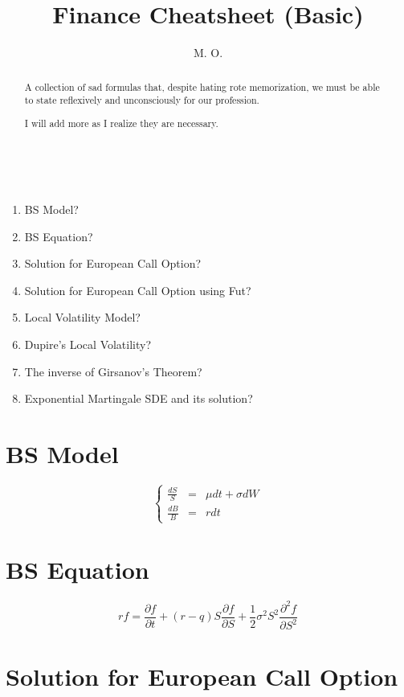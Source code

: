 \documentclass[uplatex]{jsarticle}
\title{
Finance Cheatsheet (Basic)
}
\author{
M. O.
}
\begin{document}
\maketitle

\begin{abstract}
	A collection of sad formulas that, despite hating rote memorization, we must be able to state reflexively and unconsciously for our profession.

	I will add more as I realize they are necessary.
\end{abstract}

\ \\

\begin{enumerate}
	\item BS Model?
	\item BS Equation?
	\item Solution for European Call Option?
	\item Solution for European Call Option using Fut?
	\item Local Volatility Model?
	\item Dupire's Local Volatility?
	\item The inverse of Girsanov's Theorem?
	\item Exponential Martingale SDE and its solution?
\end{enumerate}

\newpage



\section{BS Model}

\[
	\left\{
	\begin{array}{rcl}
		\displaystyle \frac{dS}{S} & = & \mu dt + \sigma dW \\
		\displaystyle \frac{dB}{B} & = & r dt
	\end{array}
	\right.
\]

\section{BS Equation}

\[
	rf
	=
	\frac{\partial f}{\partial t}
	+
	(r-q) S \frac{\partial f}{\partial S}
	+
	\frac{1}{2} \sigma^{2} S^{2}
	\frac{\partial^{2} f}{\partial S^{2}}
\]


\section{Solution for European Call Option}
\end{document}
